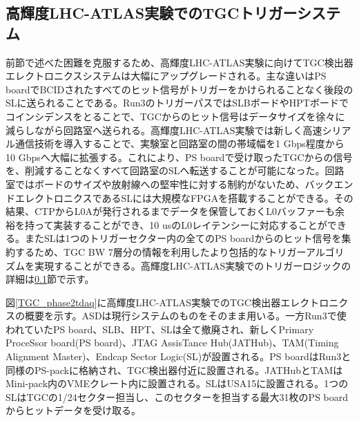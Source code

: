     \subsection{高輝度LHC-ATLAS実験でのTGCトリガーシステム}  
前節で述べた困難を克服するため、高輝度LHC-ATLAS実験に向けてTGC検出器エレクトロニクスシステムは大幅にアップグレードされる。主な違いはPS boardでBCIDされたすべてのヒット信号がトリガーをかけられることなく後段のSLに送られることである。Run3のトリガーパスではSLBボードやHPTボードでコインシデンスをとることで、TGCからのヒット信号はデータサイズを徐々に減らしながら回路室へ送られる。高輝度LHC-ATLAS実験では新しく高速シリアル通信技術を導入することで、実験室と回路室の間の帯域幅を1 Gbps程度から10 Gbpsへ大幅に拡張する。これにより、PS boardで受け取ったTGCからの信号を、削減することなくすべて回路室のSLへ転送することが可能になった。回路室ではボードのサイズや放射線への堅牢性に対する制約がないため、バックエンドエレクトロニクスであるSLには大規模なFPGAを搭載することができる。その結果、CTPからL0Aが発行されるまでデータを保管しておくL0バッファーも余裕を持って実装することができ、10 usのL0レイテンシーに対応することができる。またSLは1つのトリガーセクター内の全てのPS boardからのヒット信号を集約するため、TGC BW 7層分の情報を利用したより包括的なトリガーアルゴリズムを実現することができる。高輝度LHC-ATLAS実験でのトリガーロジックの詳細は\ref{}節で示す。

図\ref{TGC_phase2tdaq}に高輝度LHC-ATLAS実験でのTGC検出器エレクトロニクスの概要を示す。ASDは現行システムのものをそのまま用いる。一方Run3で使われていたPS board、SLB、HPT、SLは全て撤廃され、新しくPrimary ProceSsor board(PS board)、JTAG AssisTance Hub(JATHub)、TAM(Timing Alignment Master)、Endcap Sector Logic(SL)が設置される。PS boardはRun3と同様のPS-packに格納され、TGC検出器付近に設置される。JATHubとTAMはMini-pack内のVMEクレート内に設置される。SLはUSA15に設置される。1つのSLはTGCの1/24セクター担当し、このセクターを担当する最大31枚のPS boardからヒットデータを受け取る。

